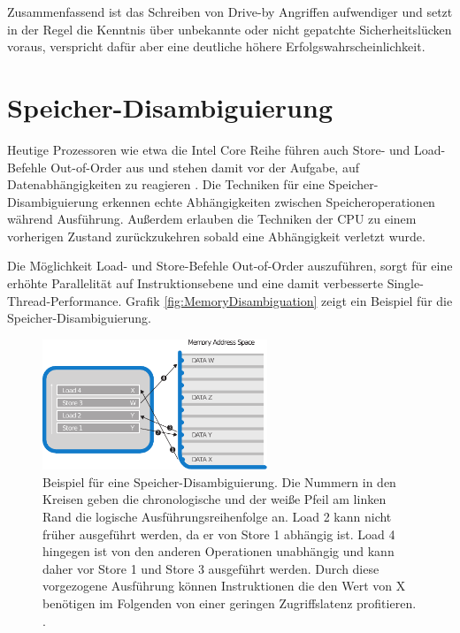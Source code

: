 Zusammenfassend ist das Schreiben von Drive-by Angriffen aufwendiger und setzt in der Regel die Kenntnis über unbekannte oder nicht gepatchte Sicherheitslücken voraus, verspricht dafür aber eine deutliche höhere Erfolgswahrscheinlichkeit.




\section{Speicher-Disambiguierung}

Heutige Prozessoren wie etwa die Intel Core Reihe führen auch Store- und Load-Befehle Out-of-Order aus und stehen damit vor der Aufgabe, auf Datenabhängigkeiten zu reagieren \cite{memoryDisambiguationBlog}.
Die Techniken für eine Speicher-Disambiguierung erkennen echte Abhängigkeiten zwischen Speicheroperationen während Ausführung. 
Außerdem erlauben die Techniken der CPU zu einem vorherigen Zustand zurückzukehren sobald eine Abhängigkeit verletzt wurde.

Die Möglichkeit Load- und Store-Befehle Out-of-Order auszuführen, sorgt für eine erhöhte Parallelität auf Instruktionsebene und eine damit verbesserte Single-Thread-Performance.
Grafik \ref{fig:MemoryDisambiguation} zeigt ein Beispiel für die Speicher-Disambiguierung. 

\label{fig:MemoryDisambiguation}
\begin{figure}[h]
\centering
\includegraphics[width=0.6\textwidth]{methods/memory_disambiguation.pdf}
\caption{Beispiel für eine Speicher-Disambiguierung. Die Nummern in den Kreisen geben die chronologische und der weiße Pfeil am linken Rand die logische Ausführungsreihenfolge an. Load 2 kann nicht früher ausgeführt werden, da er von Store 1 abhängig ist. Load 4 hingegen ist von den anderen Operationen unabhängig und kann daher vor Store 1 und Store 3 ausgeführt werden. Durch diese vorgezogene Ausführung können Instruktionen die den Wert von X benötigen im Folgenden von einer geringen Zugriffslatenz profitieren. \cite{CacheAssoWiki}.}
\end{figure}

